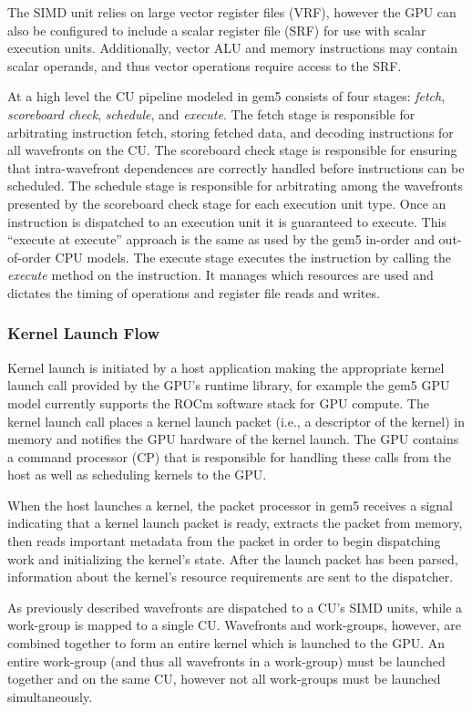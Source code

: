 The SIMD unit relies on large vector register files (VRF), however the GPU can
also be configured to include a scalar register file (SRF) for use with scalar
execution units. Additionally, vector ALU and memory instructions may contain
scalar operands, and thus vector operations require access to the SRF.

At a high level the CU pipeline modeled in gem5 consists of four stages: \textit{fetch},
\textit{scoreboard check}, \textit{schedule}, and \textit{execute}. The fetch stage
is responsible for arbitrating instruction fetch, storing fetched data,
and decoding instructions for all wavefronts on the CU. The scoreboard check stage is
responsible for ensuring that intra-wavefront dependences are
correctly handled before instructions can be scheduled. The schedule stage is
responsible for arbitrating among the wavefronts presented by
the scoreboard check stage for each execution unit type. Once an instruction is dispatched
to an execution unit it is guaranteed to execute.
This ``execute at execute'' approach is the same as used by the gem5 in-order and
out-of-order CPU models. The execute stage executes the instruction by calling the \textit{execute}
method on the instruction. It manages which resources are used and dictates the timing of
operations and register file reads and writes.

\subsubsection[Kernel Launch Flow]{Kernel Launch Flow}
Kernel launch is initiated by a host application making the appropriate kernel
launch call provided by the GPU's runtime library, for example the gem5 GPU model
currently supports the ROCm software stack for GPU compute. The kernel launch
call places a kernel launch packet (i.e., a descriptor of the kernel) in memory
and notifies the GPU hardware of
the kernel launch. The GPU contains a command processor (CP) that is responsible
for handling these calls from the host as well as scheduling kernels to the GPU.

When the host launches a kernel, the packet processor in gem5 receives a signal
indicating that a kernel launch packet is ready, extracts the packet from memory,
then reads important metadata from the packet in order to begin dispatching
work and initializing the kernel's state. After the launch packet has been parsed,
information about the kernel's resource requirements are sent to the dispatcher.

As previously described wavefronts are dispatched to a CU's SIMD units, while a work-group is mapped
to a single CU. Wavefronts and work-groups, however, are combined together to form an entire kernel
which is launched to the GPU. An entire work-group (and thus all wavefronts in a work-group) must be
launched together and on the same CU, however not all work-groups must be launched simultaneously.

